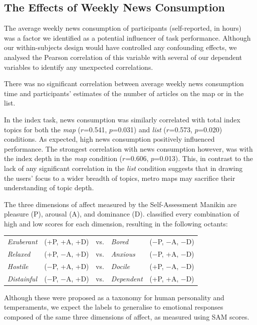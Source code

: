 \subsection{The Effects of Weekly News Consumption}

The average weekly news consumption of participants (self-reported, in hours) was a factor we identified as a potential influencer of task performance. Although our within-subjects design would have controlled any confounding effects, we analysed the Pearson correlation of this variable with several of our dependent variables to identify any unexpected correlations.

There was no significant correlation between average weekly news consumption time and participants' estimates of the number of articles on the map or in the list.

In the index task, news consumption was similarly correlated with total index topics for both the \textit{map} ($r$=0.541, $p$=0.031) and \textit{list} ($r$=0.573, $p$=0.020) conditions. As expected, high news consumption positively influenced performance. The strongest correlation with news consumption however, was with the index depth in the \textit{map} condition ($r$=0.606, $p$=0.013). This, in contrast to the lack of any significant correlation in the \textit{list} condition suggests that in drawing the users' focus to a wider breadth of topics, metro maps may sacrifice their understanding of topic depth.

The three dimensions of affect measured by the Self-Assessment Manikin \citep{measuringemotion} are pleasure (P), arousal (A), and dominance (D). \cite{emotionbasedtheory} classified every combination of high and low scores for each dimension, resulting in the following octants:

\begin{table}[htbp!]
\centering
\begin{tabular}{lllll}
\textit{Exuberant} & (+P, +A, +D) & vs. & \textit{Bored} & ($-$P, $-$A, $-$D) \\
\textit{Relaxed} & (+P, $-$A, +D) & vs. & \textit{Anxious} & ($-$P, +A, $-$D) \\
\textit{Hostile} & ($-$P, +A, +D) & vs. & \textit{Docile} & (+P, $-$A, $-$D) \\
\textit{Distainful} & ($-$P, $-$A, +D) & vs. & \textit{Dependent} & (+P, +A, $-$D)
\end{tabular}
\end{table}

Although these were proposed as a taxonomy for human personality and temperaments, we expect the labels to generalise to emotional responses composed of the same three dimensions of affect, as measured using SAM scores.

